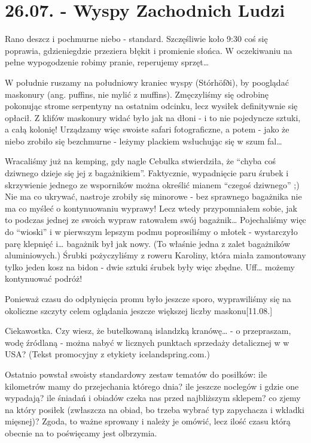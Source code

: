 \chapter*{26.07. - Wyspy Zachodnich Ludzi}

Rano deszcz i pochmurne niebo - standard. Szczęśliwie koło 9:30 coś się poprawia, gdzieniegdzie przeziera błękit i promienie słońca. W oczekiwaniu na pełne wypogodzenie robimy pranie, reperujemy sprzęt…


W południe ruszamy na południowy kraniec wyspy (Stórhöfði), by pooglądać maskonury (ang. puffins, nie mylić z muffins). Zmęczyliśmy się odrobinę pokonując strome serpentyny na ostatnim odcinku, lecz wysiłek definitywnie się opłacił. Z klifów maskonury widać było jak na dłoni - i to nie pojedyncze sztuki, a całą kolonię! Urządzamy więc swoiste safari fotograficzne, a potem - jako że niebo zrobiło się bezchmurne - leżymy plackiem wsłuchując się w szum fal…

Wracaliśmy już na kemping, gdy nagle Cebulka stwierdziła, że “chyba coś dziwnego dzieje się jej z bagażnikiem”. Faktycznie, wypadnięcie paru śrubek i skrzywienie jednego ze wsporników można określić mianem “czegoś dziwnego” ;) Nie ma co ukrywać, nastroje zrobiły się minorowe - bez sprawnego bagażnika nie ma co myśleć o kontynuowaniu wyprawy! Lecz wtedy przypomniałem sobie, jak to podczas jednej ze swoich wypraw ratowałem swój bagażnik… Pojechaliśmy więc do “wioski” i  w pierwszym lepszym podmu poprosiliśmy o młotek - wystarczyło parę klepnięć i… bagażnik był jak nowy. (To właśnie jedna z zalet bagażników aluminiowych.) Śrubki pożyczyliśmy z roweru Karoliny, która miała zamontowany tylko jeden kosz na bidon - dwie sztuki śrubek były więc zbędne. Uff… możemy kontynuować podróż!

Ponieważ czasu do odpłynięcia promu było jeszcze sporo, wyprawiliśmy się na okoliczne szczyty celem oglądania jeszcze większej liczby maskonu[11.08.]

Ciekawostka. Czy wiesz, że butelkowaną islandzką kranówę… - o przepraszam, wodę źródlaną - można nabyć w licznych punktach sprzedaży detalicznej w w USA? (Tekst promocyjny z etykiety icelandspring.com.)

Ostatnio powstał swoisty standardowy zestaw tematów do posiłków: ile kilometrów mamy do przejechania którego dnia? ile jeszcze noclegów i gdzie one wypadają? ile śniadań i obiadów czeka nas przed najbliższym sklepem? co zjemy na który posiłek (zwłaszcza na obiad, bo trzeba wybrać typ zapychacza i wkładki mięsnej)? Zgoda, to ważne sprowany i należy je omówić, lecz ilość czasu którą obecnie na to poświęcamy jest olbrzymia.


